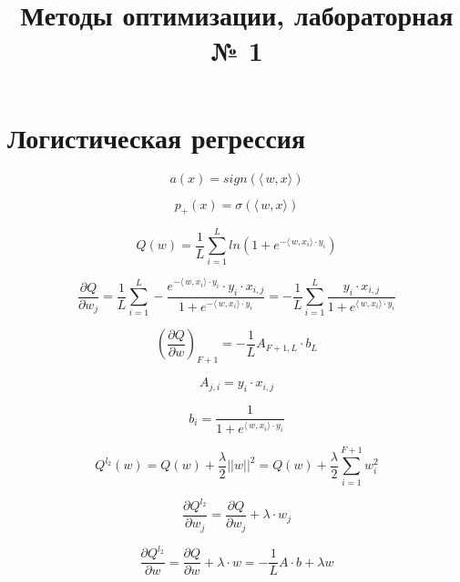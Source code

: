 \documentclass[12pt]{article}
\title{Методы оптимизации, лабораторная № 1}
\begin{document}
	\maketitle
	
\section{Логистическая регрессия}
$$a(x) = sign(\langle\,w,x\rangle)$$

$$p_+(x) = \sigma(\langle\,w,x\rangle)$$

$$Q(w) = \frac{1}{L}\sum\limits_{i = 1}^L ln(1 + e^{-\langle\,w,x_i\rangle\cdot y_i})$$

$$\frac{\partial Q}{\partial w_j} = \frac{1}{L}\sum\limits_{i = 1}^{L}-\frac{e^{-\langle\,w,x_i\rangle\cdot y_i} \cdot y_i \cdot x_{i, j}}{1 + e^{-\langle\,w,x_i\rangle\cdot y_i}} = -\frac{1}{L}\sum\limits_{i = 1}^{L}\frac{y_i \cdot x_{i, j}}{1 + e^{\langle\,w,x_i\rangle\cdot y_i}} $$

\[ 
\left( \frac{\partial Q}{\partial w} \right)_{F+1} =-\frac{1}{L} A_{F+1, L} \cdot b_{L}
\]

$$A_{j, i} = y_{i} \cdot x_{i, j}$$

$$b_i = \frac{1}{1 + e^{\langle\,w,x_i\rangle\cdot y_i}}$$

$$Q^{l_2}(w) = Q(w) + \frac{\lambda}{2}||w||^2 = Q(w) + \frac{\lambda}{2} \sum\limits_{i = 1}^{F+1}w_i^2$$

$$\frac{\partial Q^{l_2}}{\partial w_j} = \frac{\partial Q}{\partial w_j}  + \lambda \cdot w_j $$

$$\frac{\partial Q^{l_2}}{\partial w} = \frac{\partial Q}{\partial w}  + \lambda \cdot w = -\frac{1}{L} A \cdot b + \lambda w$$
\end{document}
